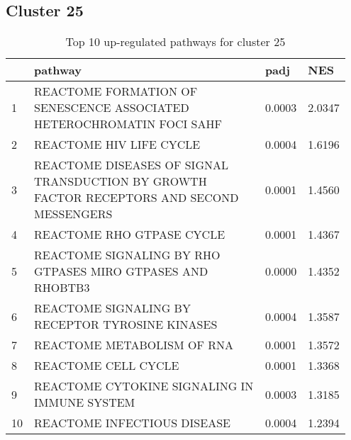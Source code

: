 \documentclass{article}
\begin{document}
\subsection{Cluster 25 }
\begin{table}[H]
\centering
\begin{tabular}{p{0.05\linewidth}p{0.7\linewidth}p{0.1\linewidth}p{0.1\linewidth}}
  \hline
 & pathway & padj & NES \\ 
  \hline
1 & REACTOME FORMATION OF SENESCENCE ASSOCIATED HETEROCHROMATIN FOCI SAHF & 0.0003 & 2.0347 \\ 
  2 & REACTOME HIV LIFE CYCLE & 0.0004 & 1.6196 \\ 
  3 & REACTOME DISEASES OF SIGNAL TRANSDUCTION BY GROWTH FACTOR RECEPTORS AND SECOND MESSENGERS & 0.0001 & 1.4560 \\ 
  4 & REACTOME RHO GTPASE CYCLE & 0.0001 & 1.4367 \\ 
  5 & REACTOME SIGNALING BY RHO GTPASES MIRO GTPASES AND RHOBTB3 & 0.0000 & 1.4352 \\ 
  6 & REACTOME SIGNALING BY RECEPTOR TYROSINE KINASES & 0.0004 & 1.3587 \\ 
  7 & REACTOME METABOLISM OF RNA & 0.0001 & 1.3572 \\ 
  8 & REACTOME CELL CYCLE & 0.0001 & 1.3368 \\ 
  9 & REACTOME CYTOKINE SIGNALING IN IMMUNE SYSTEM & 0.0003 & 1.3185 \\ 
  10 & REACTOME INFECTIOUS DISEASE & 0.0004 & 1.2394 \\ 
   \hline
\end{tabular}
\caption{Top 10 up-regulated pathways for cluster 25} 
\label{tab:q3_2_25}
\end{table}
\end{document}

